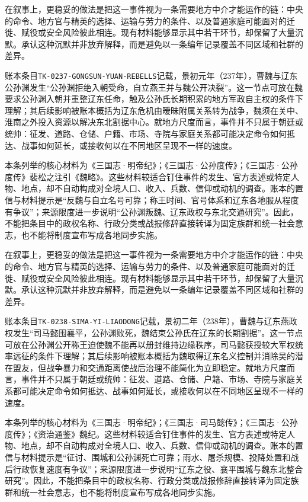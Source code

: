 在叙事上，更稳妥的做法是把这一事件视为一条需要地方中介才能运作的链：中央的命令、地方官与精英的选择、运输与劳力的条件、以及普通家庭可能面对的迁徙、赋役或安全风险彼此相连。现有材料能够显示其中若干环节，却保留了大量沉默。承认这种沉默并非放弃解释，而是避免以一条编年记录覆盖不同区域和社群的差异。

账本条目\texttt{TK-0237-GONGSUN-YUAN-REBELLS}记载，景初元年（237年），曹魏与辽东公孙渊发生“公孙渊拒绝入朝受命，自立燕王并与魏公开决裂”。这一节点可放在魏要求公孙渊入朝并重整辽东任命，触及公孙氏长期积累的地方军政自主权的条件下理解；其后续影响被账本概括为辽东危机由暧昧附属关系转为战争，魏须在关中、淮南之外投入资源以解决东北割据中心。就地方尺度而言，事件并不只属于朝廷或统帅：征发、道路、仓储、户籍、市场、寺院与家庭关系都可能决定命令如何抵达、战事如何延长，或接收何以在不同地区呈现不一样的速度。

本条列举的核心材料为《三国志·明帝纪》；《三国志·公孙度传》；《三国志·公孙度传》裴松之注引《魏略》。这些材料较适合钉住事件的发生、官方表述或特定人物、地点，却不自动构成对全境人口、收入、兵数、信仰或动机的调查。账本的置信与材料提示是“反魏与自立名号可靠；称王时间、官号体系和辽东各地服从程度有争议”；来源限度进一步说明“公孙渊叛魏、辽东政权与东北交通研究”。因此，不能把条目中的政权名称、行政分类或战报修辞直接转译为固定族群和统一社会意志，也不能将制度宣布写成各地同步实施。

在叙事上，更稳妥的做法是把这一事件视为一条需要地方中介才能运作的链：中央的命令、地方官与精英的选择、运输与劳力的条件、以及普通家庭可能面对的迁徙、赋役或安全风险彼此相连。现有材料能够显示其中若干环节，却保留了大量沉默。承认这种沉默并非放弃解释，而是避免以一条编年记录覆盖不同区域和社群的差异。

账本条目\texttt{TK-0238-SIMA-YI-LIAODONG}记载，景初二年（238年），曹魏与辽东燕政权发生“司马懿围襄平，公孙渊败死，魏结束公孙氏在辽东的长期割据”。这一节点可放在公孙渊公开称王迫使魏不能再以册封维持边缘秩序，司马懿获授较大军权统率远征的条件下理解；其后续影响被账本概括为魏取得辽东名义控制并消除吴的潜在盟友，但战争暴力和交通距离使战后治理不能简化为立即稳定。就地方尺度而言，事件并不只属于朝廷或统帅：征发、道路、仓储、户籍、市场、寺院与家庭关系都可能决定命令如何抵达、战事如何延长，或接收何以在不同地区呈现不一样的速度。

本条列举的核心材料为《三国志·明帝纪》；《三国志·司马懿传》；《三国志·公孙度传》；《资治通鉴》魏纪。这些材料较适合钉住事件的发生、官方表述或特定人物、地点，却不自动构成对全境人口、收入、兵数、信仰或动机的调查。账本的置信与材料提示是“征讨、围城和公孙渊死亡可靠；雨水、屠杀规模、投降处置和战后行政恢复速度有争议”；来源限度进一步说明“辽东之役、襄平围城与魏东北整合研究”。因此，不能把条目中的政权名称、行政分类或战报修辞直接转译为固定族群和统一社会意志，也不能将制度宣布写成各地同步实施。

